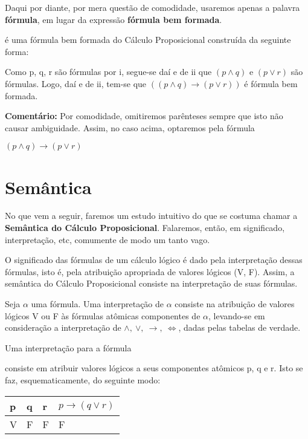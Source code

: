 Daqui por diante, por mera questão de comodidade, usaremos apenas a palavra \textbf{fórmula}, em lugar da expressão \textbf{fórmula bem formada}.


\begin{exemplo}
     é uma fórmula bem formada do Cálculo Proposicional construída da seguinte forma:
\end{exemplo}

Como p, q, r  são fórmulas por i, segue-se daí e de ii que $(p \land q)$ e $(p \lor r)$ são fórmulas.
Logo, daí e de ii, tem-se que $((p \land q) \to (p \lor r))$ é fórmula bem formada.

\bigskip

\noindent \textbf{Comentário:} Por comodidade, omitiremos parênteses sempre que isto não causar ambiguidade. Assim, no caso acima, optaremos pela fórmula


\centerline{$(p \land q) \to (p \lor r)$}

\section{Semântica}
No que vem a seguir, faremos um estudo intuitivo do que se costuma chamar a \textbf{Semântica do Cálculo Proposicional}.
Falaremos, então, em significado, interpretação, etc, comumente de modo um tanto vago.

O significado das fórmulas de um cálculo lógico é dado pela interpretação dessas fórmulas, isto é, pela atribuição apropriada de valores lógicos (V, F).
Assim, a semântica do Cálculo Proposicional consiste na interpretação de suas fórmulas.

Seja $\alpha$ uma fórmula. Uma interpretação de $\alpha$ consiste na atribuição de valores lógicos V  ou F às fórmulas atômicas componentes de $\alpha$, levando-se em consideração a interpretação de $\land,\ \lor,\ \to,\ \iff$, dadas pelas tabelas de verdade.

\begin{exemplo}
    Uma interpretação para a fórmula 
\end{exemplo}
\noindent consiste em atribuir valores lógicos a seus componentes atômicos p, q e r.
Isto se faz, esquematicamente, do seguinte modo:

\begin{center}
    \begin{tabular}{l l l l}
        p & q & r & $p \to (q \lor r)$ \\ \hline
        V & F & F & F
    \end{tabular}
\end{center}

